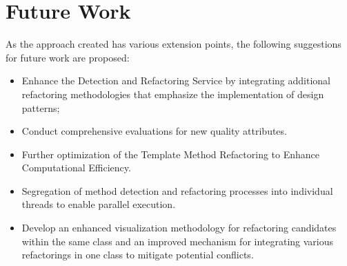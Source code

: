 \section{Future Work}

As the approach created has various extension points, the following suggestions for future work are proposed:
\begin{itemize}
  \item Enhance the Detection and Refactoring Service by integrating additional refactoring methodologies that emphasize the implementation of design patterns; 
    \item Conduct comprehensive evaluations for new quality attributes.
  \item Further optimization of the Template Method Refactoring to Enhance Computational Efficiency. 
  \item Segregation of method detection and refactoring processes into individual threads to enable parallel execution.
  \item Develop an enhanced visualization methodology for refactoring candidates within the same class and an improved mechanism for integrating various refactorings in one class to mitigate potential conflicts.
\end{itemize}